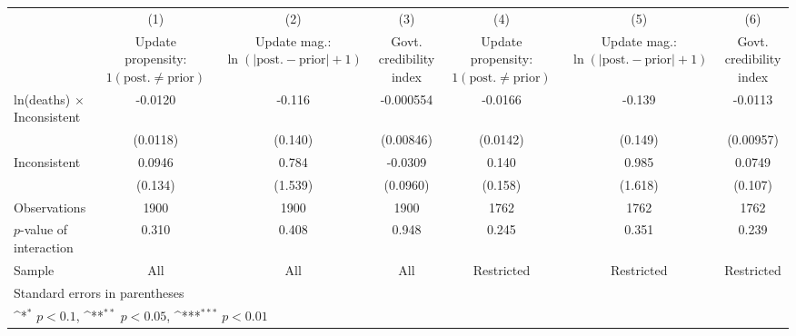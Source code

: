 {
\def\sym#1{\ifmmode^{#1}\else\(^{#1}\)\fi}
\begin{tabular}{l*{6}{c}}
\hline\hline
                    &\multicolumn{1}{c}{(1)}         &\multicolumn{1}{c}{(2)}         &\multicolumn{1}{c}{(3)}         &\multicolumn{1}{c}{(4)}         &\multicolumn{1}{c}{(5)}         &\multicolumn{1}{c}{(6)}         \\
                    &\shortstack{Update propensity: \\ $ 1(\text{post.} \neq \text{prior}) $}         &\shortstack{Update mag.: \\ $ \ln(|\text{post.}-\text{prior}|+1) $}         &\shortstack{Govt. credibility \\ index}         &\shortstack{Update propensity: \\ $ 1(\text{post.} \neq \text{prior}) $}         &\shortstack{Update mag.: \\ $ \ln(|\text{post.}-\text{prior}|+1) $}         &\shortstack{Govt. credibility \\ index}         \\
\hline
ln(deaths) $ \times $ Inconsistent&     -0.0120         &      -0.116         &   -0.000554         &     -0.0166         &      -0.139         &     -0.0113         \\
                    &    (0.0118)         &     (0.140)         &   (0.00846)         &    (0.0142)         &     (0.149)         &   (0.00957)         \\
[1em]
Inconsistent        &      0.0946         &       0.784         &     -0.0309         &       0.140         &       0.985         &      0.0749         \\
                    &     (0.134)         &     (1.539)         &    (0.0960)         &     (0.158)         &     (1.618)         &     (0.107)         \\
\hline
Observations        &        1900         &        1900         &        1900         &        1762         &        1762         &        1762         \\
$ p $-value of interaction&       0.310         &       0.408         &       0.948         &       0.245         &       0.351         &       0.239         \\
Sample              &         All         &         All         &         All         &  Restricted         &  Restricted         &  Restricted         \\
\hline\hline
\multicolumn{7}{l}{\footnotesize Standard errors in parentheses}\\
\multicolumn{7}{l}{\footnotesize \sym{*} \(p<0.1\), \sym{**} \(p<0.05\), \sym{***} \(p<0.01\)}\\
\end{tabular}
}
